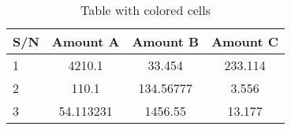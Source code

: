 \documentclass{article}
\begin{document}
\begin{table}
		

	\centering
	\caption{Table with colored cells}
	\label{tab:table1}
	\begin{tabular}{|l|S|S|c|}
		\hline
		\textbf{S/N} & \textbf{Amount A} & \textbf{Amount B} & \textbf{Amount C}\\
		\hline
		1&4210.1&33.454&233.114\\
		2&110.1&134.56777&3.556\\
		3&54.113231&1456.55&13.177\\
		\hline
	\end{tabular}
\end{table}
\end{document}
